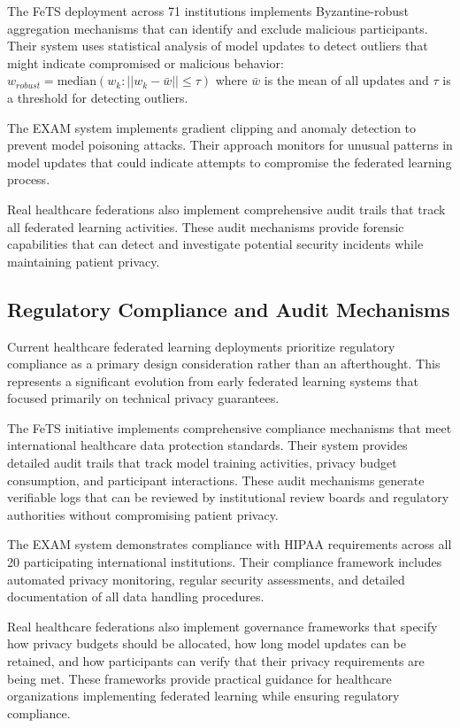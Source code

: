 \documentclass[3p,times,procedia]{elsarticle}
\begin{document}
The FeTS deployment across 71 institutions implements Byzantine-robust aggregation mechanisms that can identify and exclude malicious participants. Their system uses statistical analysis of model updates to detect outliers that might indicate compromised or malicious behavior:
$w_{robust} = \text{median}({w_k : ||w_k - \bar{w}|| \leq \tau})$
where $\bar{w}$ is the mean of all updates and $\tau$ is a threshold for detecting outliers.

The EXAM system implements gradient clipping and anomaly detection to prevent model poisoning attacks. Their approach monitors for unusual patterns in model updates that could indicate attempts to compromise the federated learning process.

Real healthcare federations also implement comprehensive audit trails that track all federated learning activities. These audit mechanisms provide forensic capabilities that can detect and investigate potential security incidents while maintaining patient privacy.

\subsection{Regulatory Compliance and Audit Mechanisms}

Current healthcare federated learning deployments prioritize regulatory compliance as a primary design consideration rather than an afterthought. This represents a significant evolution from early federated learning systems that focused primarily on technical privacy guarantees.

The FeTS initiative implements comprehensive compliance mechanisms that meet international healthcare data protection standards. Their system provides detailed audit trails that track model training activities, privacy budget consumption, and participant interactions. These audit mechanisms generate verifiable logs that can be reviewed by institutional review boards and regulatory authorities without compromising patient privacy.

The EXAM system demonstrates compliance with HIPAA requirements across all 20 participating international institutions. Their compliance framework includes automated privacy monitoring, regular security assessments, and detailed documentation of all data handling procedures.

Real healthcare federations also implement governance frameworks that specify how privacy budgets should be allocated, how long model updates can be retained, and how participants can verify that their privacy requirements are being met. These frameworks provide practical guidance for healthcare organizations implementing federated learning while ensuring regulatory compliance.
\end{document}
